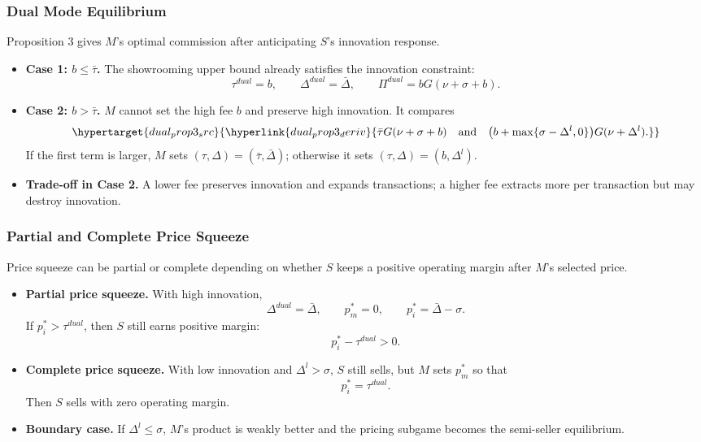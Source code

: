 \begin{frame}
  \frametitle{Dual Mode Equilibrium}
  \footnotesize
  Proposition 3 gives $M$'s optimal commission after anticipating $S$'s
  innovation response.

  \begin{itemize}
    \item \textbf{Case 1: $b\leq\bar{\tau}$.} The showrooming upper bound
      already satisfies the innovation constraint:
      \[
        \tau^{dual}=b,\qquad
        \Delta^{dual}=\bar{\Delta},\qquad
        \Pi^{dual}=bG(\nu+\sigma+b).
      \]

    \item \textbf{Case 2: $b>\bar{\tau}$.} $M$ cannot set the high fee $b$
      and preserve high innovation. It compares
      \[
        \hypertarget{dual_prop3_src}{%
          \hyperlink{dual_prop3_deriv}{%
            \bar{\tau}G(\nu+\sigma+b)
            \quad\text{and}\quad
            \bigl(b+\max\{\sigma-\Delta^l,0\}\bigr)G(\nu+\Delta^l).}}
      \]
      If the first term is larger, $M$ sets
      $(\tau,\Delta)=(\bar{\tau},\bar{\Delta})$; otherwise it sets
      $(\tau,\Delta)=(b,\Delta^l)$.

    \item \textbf{Trade-off in Case 2.} A lower fee preserves innovation and
      expands transactions; a higher fee extracts more per transaction but
      may destroy innovation.
  \end{itemize}
\end{frame}

\begin{frame}
  \frametitle{Partial and Complete Price Squeeze}
  \footnotesize
  Price squeeze can be partial or complete depending on whether $S$ keeps a
  positive operating margin after $M$'s selected price.

  \begin{itemize}
    \item \textbf{Partial price squeeze.} With high innovation,
      \[
        \Delta^{dual}=\bar{\Delta},\qquad
        p_m^*=0,\qquad
        p_i^*=\bar{\Delta}-\sigma.
      \]
      If $p_i^*>\tau^{dual}$, then $S$ still earns positive margin:
      \[
        p_i^*-\tau^{dual}>0.
      \]

    \item \textbf{Complete price squeeze.} With low innovation and
      $\Delta^l>\sigma$, $S$ still sells, but $M$ sets $p_m^*$ so that
      \[
        p_i^*=\tau^{dual}.
      \]
      Then $S$ sells with zero operating margin.

    \item \textbf{Boundary case.} If $\Delta^l\leq\sigma$, $M$'s product is
      weakly better and the pricing subgame becomes the semi-seller
      equilibrium.
  \end{itemize}
\end{frame}

